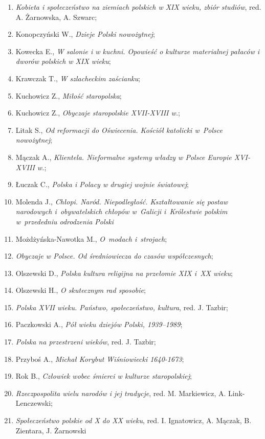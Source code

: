 \documentclass[a4paper,11pt]{article}
\begin{document}
\begin{enumerate}
{    studiów}, red. A. Żarnowska, A. Szwarc;
\item \emph{Kobieta i społeczeństwo na ziemiach polskich w XIX wieku,
    zbiór studiów}, red. A. Żarnowska, A. Szwarc;
\item Konopczyński W., \emph{Dzieje Polski nowożytnej};
\item Kowecka E., \emph{W salonie i w kuchni. Opowieść o kulturze
    materialnej pałaców i dworów polskich w XIX wieku};
\item Krawczak T., \emph{W szlacheckim zaścianku};
\item Kuchowicz Z., \emph{Miłość staropolska};
\item Kuchowicz Z., \emph{Obyczaje staropolskie XVII-XVIII w.};
\item Litak S., \emph{Od reformacji do Oświecenia. Kościół katolicki
    w~Polsce nowożytnej};
\item Mączak A., \emph{Klientela. Nieformalne systemy władzy w Polsce
    Europie XVI-XVIII w.};
\item Łuczak C., \emph{Polska i Polacy w drugiej wojnie światowej};
\item Molenda J., \emph{Chłopi. Naród. Niepodległość. Kształtowanie
    się postaw narodowych i~obywatelskich chłopów w~Galicji
    i~Królestwie polskim w~przededniu odrodzenia Polski}
\item Możdżyńska-Nawotka M., \emph{O~modach i~strojach};
\item \emph{Obyczaje w Polsce. Od średniowiecza do czasów
    współczesnych};
\item Olszewski D., \emph{Polska kultura religijna na przełomie XIX
    i~XX wieku};
\item Olszewski H., \emph{O skutecznym rad sposobie};
\item \emph{Polska XVII wieku. Państwo, społeczeństwo, kultura}, red.
  J. Tazbir;
\item Paczkowski A., \emph{Pół wieku dziejów Polski, 1939--1989};
\item \emph{Polska na przestrzeni wieków}, red. J. Tazbir;
\item Przyboś A., \emph{Michał Korybut Wiśniowiecki 1640-1673};
\item Rok B., \emph{Człowiek wobec śmierci w kulturze staropolskiej};
\item \emph{Rzeczpospolita wielu narodów i jej tradycje}, red. M.
  Markiewicz, A. Link-Lenczewski;
\item \emph{Społeczeństwo polskie od X do XX wieku}, red. I.
  Ignatowicz, A. Mączak, B. Zientara, J. Żarnowski

\end{enumerate}
\end{document}
